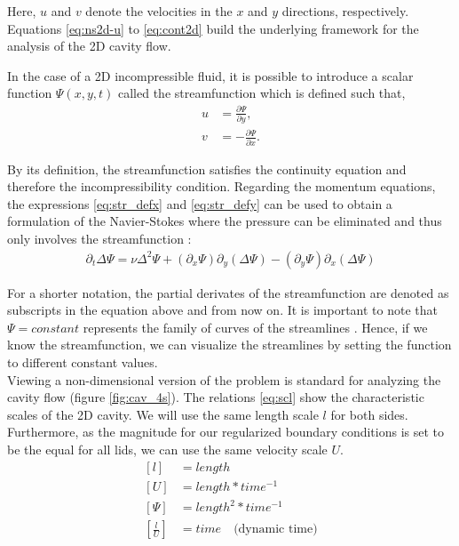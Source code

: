 Here, $u$ and $v$ denote the velocities in the $x$ and $y$ directions,
respectively. Equations \eqref{eq:ns2d-u} to \eqref{eq:cont2d} build the
underlying framework for the analysis of the 2D cavity flow.

\clearpage

In the case of a 2D incompressible fluid, it is possible to introduce a scalar
function $\Psi(x,y,t)$ called the streamfunction which is defined such that,
\begin{align}
u & = \frac{\partial \Psi}{\partial y}, \label{eq:str_defx} \\
v & = -\frac{\partial \Psi}{\partial x}. \label{eq:str_defy} 
\end{align}

By its definition, the streamfunction satisfies the continuity equation and
therefore the incompressibility condition. Regarding the momentum equations,
the expressions \eqref{eq:str_defx} and \eqref{eq:str_defy} can be used to
obtain a formulation of the Navier-Stokes where the pressure can be eliminated
and thus only involves the streamfunction \citep{landau1987}:
\begin{align}
\partial_t \Delta \Psi = \nu \Delta^2 \Psi
  + (\partial_x \Psi) \partial_y(\Delta \Psi)
  - (\partial_y \Psi) \partial_x(\Delta \Psi) \label{eq:str_dim}
\end{align}

For a shorter notation, the partial derivates of the streamfunction are denoted
as subscripts in the equation above and from now on. It is important to note
that $\Psi = constant$ represents the family of curves of the streamlines
\citep{landau1987}. Hence, if we know the streamfunction, we can visualize the
streamlines by setting the function to different constant values. \\

Viewing a non-dimensional version of the problem is standard for analyzing the
cavity flow (figure \ref{fig:cav_4s}). The relations \eqref{eq:scl} show the
characteristic scales of the 2D cavity. We will use the same length scale $l$
for both sides. Furthermore, as the magnitude for our regularized boundary
conditions is set to be the equal for all lids, we can use the same velocity
scale $U$.
\begin{equation}
\begin{split}
\left[ l \right] &= length  \\
\left[ U \right] &= length*time^{-1} \\
\left[ \Psi \right] &= length^2*time^{-1} \\
\left[ \frac{l}{U} \right] &= time \quad \text{(dynamic time)} \\
\end{split}
\label{eq:scl}
\end{equation}

